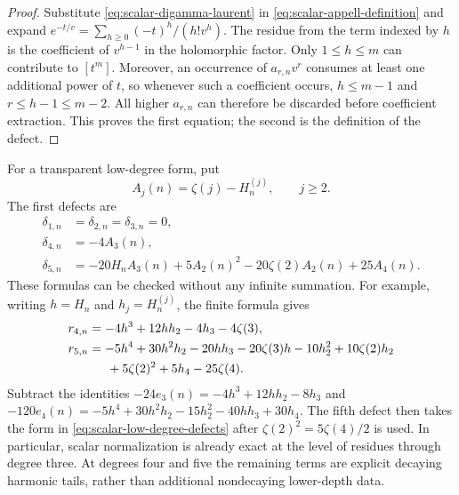 \begin{proof}
Substitute \eqref{eq:scalar-digamma-laurent} in
\eqref{eq:scalar-appell-definition} and expand
$e^{-t/v}=\sum_{h\geq0}(-t)^h/(h!v^h)$.  The residue from
the term indexed by $h$ is the coefficient of $v^{h-1}$ in
the holomorphic factor.  Only $1\leq h\leq m$ can contribute
to $[t^m]$.  Moreover, an occurrence of $a_{r,n}v^r$ consumes
at least one additional power of $t$, so whenever such a coefficient
occurs, $h\leq m-1$ and $r\leq h-1\leq m-2$.
All higher $a_{r,n}$ can therefore
be discarded before coefficient extraction.  This proves the
first equation; the second is the definition of the defect.
\end{proof}

For a transparent low-degree form, put
\begin{equation}
 A_j(n)=\zeta(j)-H_n^{(j)},\qquad j\geq2.
 \label{eq:scalar-harmonic-tails}
\end{equation}
The first defects are
\begin{equation}
 \begin{aligned}
 \delta_{1,n}&=\delta_{2,n}=\delta_{3,n}=0,\\
 \delta_{4,n}&=-4A_3(n),\\
 \delta_{5,n}&=-20H_nA_3(n)+5A_2(n)^2
                 -20\zeta(2)A_2(n)+25A_4(n).
 \end{aligned}
 \label{eq:scalar-low-degree-defects}
\end{equation}
These formulas can be checked without any infinite summation.
For example, writing $h=H_n$ and $h_j=H_n^{(j)}$, the finite
formula gives
\begin{equation}
 \begin{aligned}
 r_{4,n}&=-4h^3+12hh_2-4h_3-4\zeta(3),\\
 r_{5,n}&=-5h^4+30h^2h_2-20hh_3-20\zeta(3)h
           -10h_2^2+10\zeta(2)h_2\\
        &\hspace{1.5em}+5\zeta(2)^2+5h_4-25\zeta(4).
 \end{aligned}
 \label{eq:scalar-fourth-fifth-residues}
\end{equation}
Subtract the identities
$-24e_3(n)=-4h^3+12hh_2-8h_3$ and
$-120e_4(n)=-5h^4+30h^2h_2-15h_2^2-40hh_3+30h_4$.
The fifth defect then takes the form in
\eqref{eq:scalar-low-degree-defects} after
$\zeta(2)^2=5\zeta(4)/2$ is used.  In particular, scalar
normalization is already exact at the level of residues through
degree three.  At degrees four and five the remaining terms are
explicit decaying harmonic tails, rather than additional
nondecaying lower-depth data.

